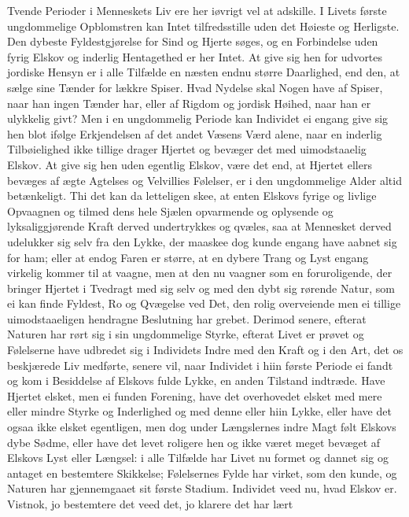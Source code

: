 \documentclass[12pt,a4paper]{book}
\newcommand{\apage}[1]{\marginnote{\footnotesize\textit{[#1]}}}
\begin{document}
Tvende Perioder i Menneskets Liv ere her iøvrigt vel at adskille. I
Livets første ungdommelige Opblomstren kan Intet tilfredsstille uden det
Høieste og Herligste. Den dybeste Fyldestgjørelse for Sind og Hjerte
søges, og en Forbindelse uden fyrig Elskov og inderlig Hentagethed er
her Intet. At give sig hen for udvortes jordiske Hensyn er i alle
Tilfælde en næsten endnu større Daarlighed, end den, at sælge sine
Tænder for lækkre Spiser. Hvad Nydelse skal Nogen have af Spiser, naar
han ingen Tænder har, eller af Rigdom og jordisk Høihed, naar han er
ulykkelig givt? Men i en ungdommelig Periode kan Individet ei engang
give sig hen blot ifølge Erkjendelsen af det andet Væsens Værd alene,
naar en inderlig Tilbøielighed ikke tillige drager Hjertet og bevæger
det med uimodstaaelig Elskov. At give sig hen uden egentlig Elskov, være
det end, at Hjertet ellers bevæges af ægte Agtelses og \apage{75} Velvillies
Følelser, er i den ungdommelige Alder altid betænkeligt. Thi det kan da
letteligen skee, at enten Elskovs fyrige og livlige Opvaagnen og tilmed
dens hele Sjælen opvarmende og oplysende og lyksaliggjørende Kraft
derved undertrykkes og qvæles, saa at Mennesket derved udelukker sig
selv fra den Lykke, der maaskee dog kunde engang have aabnet sig for
ham; eller at endog Faren er større, at en dybere Trang og Lyst engang
virkelig kommer til at vaagne, men at den nu vaagner som en
foruroligende, der bringer Hjertet i Tvedragt med sig selv og med den
dybt sig rørende Natur, som ei kan finde Fyldest, Ro og Qvægelse ved
Det, den rolig overveiende men ei tillige uimodstaaeligen hendragne
Beslutning har grebet. Derimod senere, efterat Naturen har rørt sig i
sin ungdommelige Styrke, efterat Livet er prøvet og Følelserne have
udbredet sig i Individets Indre med den Kraft og i den Art, det os
beskjærede Liv medførte, senere vil, naar Individet i hiin første
Periode ei fandt og kom i Besiddelse af Elskovs fulde Lykke, en anden
Tilstand indtræde. Have Hjertet elsket, men ei funden Forening, have det
overhovedet elsket med mere eller mindre Styrke og Inderlighed og med
denne eller hiin Lykke, eller have det ogsaa ikke elsket egentligen, men
dog under Længslernes indre Magt følt Elskovs dybe Sødme, eller have det
levet roligere hen og ikke været meget bevæget af Elskovs Lyst eller
Længsel: i alle Tilfælde har Livet nu formet og dannet sig og antaget en
bestemtere Skikkelse; \apage{76} Følelsernes Fylde har virket, som den kunde, og
Naturen har gjennemgaaet sit første Stadium. Individet veed nu, hvad
Elskov er. Vistnok, jo bestemtere det veed det, jo klarere det har lært
\end{document}
